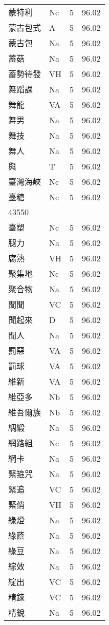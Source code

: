 \documentclass[twocolumn]{book}
\begin{document}
\begin{supertabular}{llrr}
蒙特利 & Nc & 5 &  96.02\\
蒙古包式 & A & 5 &  96.02\\
蒙古包 & Na & 5 &  96.02\\
蓄菇 & Na & 5 &  96.02\\
蓄勢待發 & VH & 5 &  96.02\\
舞蹈課 & Na & 5 &  96.02\\
舞龍 & VA & 5 &  96.02\\
舞男 & Na & 5 &  96.02\\
舞技 & Na & 5 &  96.02\\
舞人 & Na & 5 &  96.02\\
與 & T & 5 &  96.02\\
臺灣海峽 & Nc & 5 &  96.02\\
臺糖 & Nc & 5 &  96.02\\
43550\\
臺塑 & Nc & 5 &  96.02\\
腿力 & Na & 5 &  96.02\\
腐熟 & VH & 5 &  96.02\\
聚集地 & Nc & 5 &  96.02\\
聚合物 & Na & 5 &  96.02\\
聞聞 & VC & 5 &  96.02\\
聞起來 & D & 5 &  96.02\\
聞人 & Na & 5 &  96.02\\
罰惡 & VA & 5 &  96.02\\
罰球 & VA & 5 &  96.02\\
維新 & VA & 5 &  96.02\\
維亞多 & Nb & 5 &  96.02\\
維吾爾族 & Nb & 5 &  96.02\\
綢緞 & Na & 5 &  96.02\\
網路組 & Nc & 5 &  96.02\\
網卡 & Na & 5 &  96.02\\
緊箍咒 & Na & 5 &  96.02\\
緊追 & VC & 5 &  96.02\\
緊俏 & VH & 5 &  96.02\\
綠燈 & Na & 5 &  96.02\\
綠蔭 & Na & 5 &  96.02\\
綠豆 & Na & 5 &  96.02\\
綜效 & Na & 5 &  96.02\\
綻出 & VC & 5 &  96.02\\
精鍊 & VC & 5 &  96.02\\
精銳 & Na & 5 &  96.02\\

\end{supertabular}
\end{document}
